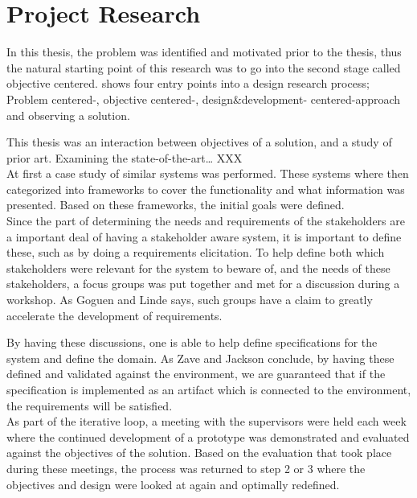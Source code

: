 
\section{Project Research} %
\label{sec:workshops}
In this thesis, the problem was 
identified and motivated prior to the thesis, thus the natural starting 
point of this research was to go into the second stage called objective 
centered.  shows four entry points into a design 
research process; Problem centered-, objective centered-, design\&development-
centered-approach and observing a solution. 

This thesis was an interaction between objectives of a solution, and a study of prior 
art. Examining the state-of-the-art… XXX\\
At first a case study of similar 
systems was performed. These systems where then categorized into frameworks to 
cover the functionality and what information was presented. Based on these 
frameworks, the initial goals were defined.\\


Since the part of determining the needs and requirements of the stakeholders 
are a important deal of having a stakeholder aware system, it is important to
define these, such as by doing a requirements elicitation. To help define both 
which stakeholders were relevant for the system to beware of, and the needs of 
these stakeholders, a focus groups was put together and met for a discussion
during a workshop. As Goguen and Linde \cite{goguen1993techniques} says, such 
groups have a claim to greatly accelerate the development of requirements.

By having these discussions, one is able to help define specifications for the
system and define the domain. As Zave and Jackson \cite{zave1997four} 
conclude, by having these defined and validated against the environment, we
are guaranteed that if the specification is implemented as an artifact which
is connected to the environment, the requirements will be satisfied. \\


As part of the iterative loop, a meeting with the supervisors were held each 
week where the continued development of a prototype was demonstrated and 
evaluated against the objectives of the solution. Based on the evaluation that 
took place during these meetings, the process was returned to step 2 or 3 
where the objectives and design were looked at again and optimally redefined.



